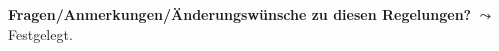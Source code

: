 \begin{frame}
{%
%          
          \par\medskip
          \textbf{Fragen/Anmerkungen/Änderungswünsche zu diesen Regelungen?}
          $\leadsto$ Festgelegt.
          
          \par
                
      }
    \end{frame}

